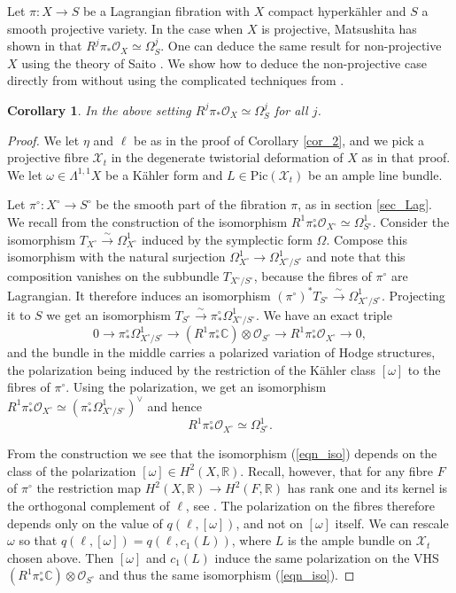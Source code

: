 \documentclass[10pt]{amsart}
\newcommand{\bbR}{\mathbb{R}}
\newcommand{\bbC}{\mathbb{C}}
\newcommand{\OO}{\mathcal{O}}
\newcommand{\XX}{\mathcal{X}}
\newcommand{\lrarr}{\longrightarrow}
\newtheorem{cor}[defn]{Corollary}
\begin{document}
Let $\pi\colon X\to S$ be a Lagrangian fibration
with $X$ compact hyperk\"ahler and $S$ a smooth projective variety. In the case when $X$ is projective,
Matsushita has shown in \cite{Ma3} that $R^j\pi_*\OO_X \simeq \Omega^j_S$. One can deduce the same result for non-projective $X$
using the theory of Saito \cite{Sa}. We show how to deduce the non-projective case
directly from \cite{Ma3} without using the complicated techniques from \cite{Sa}.

\begin{cor}\label{cor_3} In the above setting $R^j\pi_*\OO_X \simeq \Omega^j_S$ for all $j$.
\end{cor}
\begin{proof}
We let $\eta$ and $\ell$ be as in the proof of Corollary \ref{cor_2},
and we pick a projective fibre $\XX_t$ in the degenerate twistorial deformation
of $X$ as in that proof. We let $\omega\in \Lambda^{1,1}X$ be a K\"ahler form
and $L\in\mathrm{Pic}(\XX_t)$ be an ample line bundle.

Let $\pi^\circ\colon X^\circ\to S^\circ$ be the smooth part of the fibration $\pi$,
as in section \ref{sec_Lag}. We recall from \cite[section 2]{Ma3} the construction
of the isomorphism $R^1\pi^\circ_*\OO_{X^\circ} \simeq \Omega^1_{S^\circ}$.
Consider the isomorphism $T_{X^\circ}\stackrel{\sim}{\to} \Omega^1_{X^\circ}$
induced by the symplectic form $\Omega$. Compose this isomorphism with 
the natural surjection $\Omega^1_{X^\circ} \to \Omega^1_{X^\circ/S^\circ}$
and note that this composition vanishes on the subbundle $T_{X^\circ/S^\circ}$,
because the fibres of $\pi^\circ$ are Lagrangian. It therefore induces
an isomorphism $(\pi^\circ)^*T_{S^\circ}\stackrel{\sim}{\to} \Omega^1_{X^\circ/S^\circ}$.
Projecting it to $S$ we get an isomorphism $T_{S^\circ}\stackrel{\sim}{\to} \pi^\circ_*\Omega^1_{X^\circ/S^\circ}$.
We have an exact triple
$$
0\lrarr \pi^\circ_*\Omega^1_{X^\circ/S^\circ} \lrarr (R^1\pi^\circ_*\bbC)\otimes \OO_{S^\circ}\lrarr R^1\pi^\circ_*\OO_{X^\circ}\lrarr 0,
$$
and the bundle in the middle carries a polarized variation of Hodge structures, the
polarization being induced by the restriction of the K\"ahler class $[\omega]$ to the fibres of $\pi^\circ$.
Using the polarization, we get an isomorphism $R^1\pi^\circ_*\OO_{X^\circ} \simeq (\pi^\circ_*\Omega^1_{X^\circ/S^\circ})^\vee$
and hence
\begin{equation}\label{eqn_iso}
R^1\pi^\circ_*\OO_{X^\circ} \simeq \Omega^1_{S^\circ}.
\end{equation}

From the construction we see that the isomorphism (\ref{eqn_iso}) depends
on the class of the polarization $[\omega]\in H^2(X,\bbR)$. Recall, however,
that for any fibre $F$ of $\pi^\circ$ the restriction map $H^2(X,\bbR) \to H^2(F,\bbR)$
has rank one and its kernel is the orthogonal complement of $\ell$, see \cite[Lemma 2.2]{Ma4}.
The polarization on the fibres therefore depends only
on the value of $q(\ell,[\omega])$, and not on $[\omega]$ itself.
We can rescale $\omega$ so that $q(\ell,[\omega]) = q(\ell,c_1(L))$, where $L$ is
the ample bundle on $\XX_t$ chosen above. Then $[\omega]$ and $c_1(L)$ induce the same
polarization on the VHS $(R^1\pi^\circ_*\bbC)\otimes \OO_{S^\circ}$ and thus
the same isomorphism (\ref{eqn_iso}).


\end{proof}
\end{document}
